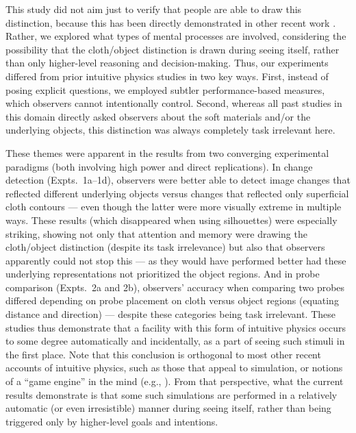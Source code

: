 This study did not aim just to verify that people are able to draw this distinction, because this has been directly demonstrated in other recent work \parencite{phillips_veiled_2020, ullman_draping_2019, yildirim_perceiving_2016}. Rather, we explored what types of mental processes are involved, considering the possibility that the cloth/object distinction is drawn during seeing itself, rather than only higher-level reasoning and decision-making. Thus, our experiments differed from prior intuitive physics studies in two key ways. First, instead of posing explicit questions, we employed subtler performance-based measures, which observers cannot intentionally control. Second, whereas all past studies in this domain directly asked observers about the soft materials and/or the underlying objects, this distinction was always completely task irrelevant here.

These themes were apparent in the results from two converging experimental paradigms (both involving high power and direct replications). In change detection (Expts.~1a–1d), observers were better able to detect image changes that reflected different underlying objects versus changes that reflected only superficial cloth contours --- even though the latter were more visually extreme in multiple ways. These results (which disappeared when using silhouettes) were especially striking, showing not only that attention and memory were drawing the cloth/object distinction (despite its task irrelevance) but also that observers apparently could not stop this --- as they would have performed better had these underlying representations not prioritized the object regions. And in probe comparison (Expts.~2a and 2b), observers’ accuracy when comparing two probes differed depending on probe placement on cloth versus object regions (equating distance and direction) --- despite these categories being task irrelevant. These studies thus demonstrate that a facility with this form of intuitive physics occurs to some degree automatically and incidentally, as a part of seeing such stimuli in the first place. Note that this conclusion is orthogonal to most other recent accounts of intuitive physics, such as those that appeal to simulation, or notions of a “game engine” in the mind (e.g., \cite{battaglia_simulation_2013, hamrick_inferring_2016, ullman_mind_2017}). From that perspective, what the current results demonstrate is that some such simulations are performed in a relatively automatic (or even irresistible) manner during seeing itself, rather than being triggered only by higher-level goals and intentions.

